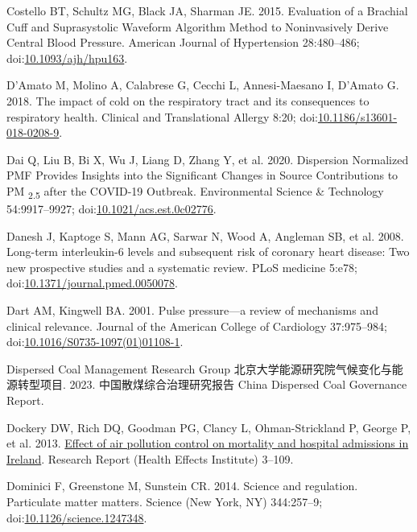 \documentclass[
  letterpaper,
  DIV=11,
  numbers=noendperiod]{scrartcl}
\newlength{\cslhangindent}
\newenvironment{CSLReferences}[2] %
 {\begin{list}{}{%
  \setlength{\itemindent}{0pt}
  \setlength{\leftmargin}{0pt}
  \setlength{\parsep}{0pt}
  \ifodd #1
   \setlength{\leftmargin}{\cslhangindent}
   \setlength{\itemindent}{-1\cslhangindent}
  \fi
  \setlength{\itemsep}{#2\baselineskip}}}
 {\end{list}}
\begin{document}
\begin{CSLReferences}{1}{1}
Costello BT, Schultz MG, Black JA, Sharman JE. 2015. Evaluation of a
{Brachial Cuff} and {Suprasystolic Waveform Algorithm Method} to
{Noninvasively Derive Central Blood Pressure}. American Journal of
Hypertension 28:480--486;
doi:\href{https://doi.org/10.1093/ajh/hpu163}{10.1093/ajh/hpu163}.

D'Amato M, Molino A, Calabrese G, Cecchi L, Annesi-Maesano I, D'Amato G.
2018. The impact of cold on the respiratory tract and its consequences
to respiratory health. Clinical and Translational Allergy 8:20;
doi:\href{https://doi.org/10.1186/s13601-018-0208-9}{10.1186/s13601-018-0208-9}.

Dai Q, Liu B, Bi X, Wu J, Liang D, Zhang Y, et al. 2020. Dispersion
{Normalized PMF Provides Insights} into the {Significant Changes} in
{Source Contributions} to {PM} {\textsubscript{2.5}} after the {COVID-19
Outbreak}. Environmental Science \& Technology 54:9917--9927;
doi:\href{https://doi.org/10.1021/acs.est.0c02776}{10.1021/acs.est.0c02776}.

Danesh J, Kaptoge S, Mann AG, Sarwar N, Wood A, Angleman SB, et al.
2008. Long-term interleukin-6 levels and subsequent risk of coronary
heart disease: Two new prospective studies and a systematic review. PLoS
medicine 5:e78;
doi:\href{https://doi.org/10.1371/journal.pmed.0050078}{10.1371/journal.pmed.0050078}.

Dart AM, Kingwell BA. 2001. Pulse pressure---a review of mechanisms and
clinical relevance. Journal of the American College of Cardiology
37:975--984;
doi:\href{https://doi.org/10.1016/S0735-1097(01)01108-1}{10.1016/S0735-1097(01)01108-1}.

Dispersed Coal Management Research Group
北京大学能源研究院气候变化与能源转型项目. 2023. 中国散煤综合治理研究报告
{China Dispersed Coal Governance Report}.

Dockery DW, Rich DQ, Goodman PG, Clancy L, Ohman-Strickland P, George P,
et al. 2013. \href{https://www.ncbi.nlm.nih.gov/pubmed/24024358}{Effect
of air pollution control on mortality and hospital admissions in
{Ireland}}. Research Report (Health Effects Institute) 3--109.

Dominici F, Greenstone M, Sunstein CR. 2014. Science and regulation.
{Particulate} matter matters. Science (New York, NY) 344:257--9;
doi:\href{https://doi.org/10.1126/science.1247348}{10.1126/science.1247348}.


\end{CSLReferences}
\end{document}
